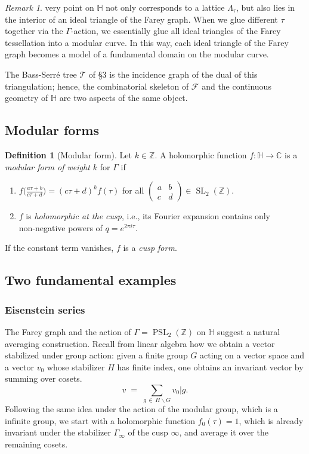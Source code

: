 \documentclass[10pt, a4paper]{article}
\newcommand{\C}{\mathbb{C}}
\newcommand{\Z}{\mathbb{Z}}
\newcommand{\HH}{\mathbb{H}} %
\newcommand{\SL}{\operatorname{SL}_2(\Z)}
\newcommand{\PSL}{\operatorname{PSL}_2(\Z)}
\theoremstyle{definition}
\newtheorem{definition}[theorem]{Definition}
\theoremstyle{remark}
\newtheorem{remark}[theorem]{Remark}
\begin{document}
\begin{remark}
very point on $\HH$ not only corresponds to a lattice $\Lambda_\tau$, but also lies in the interior of an ideal triangle of the Farey graph.
When we glue different $\tau$ together via the $\Gamma$-action, we essentially glue all ideal triangles of the Farey tessellation into a modular curve.
In this way, each ideal triangle of the Farey graph becomes a model of a fundamental domain on the modular curve.
\end{remark}

The Bass-Serré tree $\mathcal{T}$ of \S3 is the incidence graph of the dual of this triangulation; hence, the combinatorial skeleton of $\mathcal{F}$ and the continuous geometry of $\HH$ are two aspects of the same object.

\subsection{Modular forms}



\begin{definition}[Modular form]\cite{Serre1973}
Let $k\in\Z$. A holomorphic function $f:\HH\to\C$ is a \emph{modular form of weight $k$} for $\Gamma$ if
\begin{enumerate}
    \item $f\!\big(\frac{a\tau+b}{c\tau+d}\big) = (c\tau+d)^k f(\tau)$ for all $\begin{pmatrix}a&b\\c&d\end{pmatrix}\in\SL$.
    \item $f$ is \emph{holomorphic at the cusp}, i.e., its Fourier expansion contains only non‑negative powers of $q = e^{2\pi i\tau}$.
\end{enumerate}
If the constant term vanishes, $f$ is a \emph{cusp form}.
\end{definition}



\subsection{Two fundamental examples}

\subsubsection{Eisenstein series}
\label{subsec:Eisenstein_series}

The Farey graph and the action of $\Gamma=\PSL$ on $\HH$ suggest a natural averaging construction.
Recall from linear algebra how we obtain a vector stabilized under group action: given a finite group $G$ acting on a vector space and a vector $v_0$ whose stabilizer $H$ has finite index, one obtains an invariant vector by summing over cosets.\cite{Zagier2008}
\[
v \;=\; \sum_{g\,\in\,H\backslash G} v_0|g .
\]
Following the same idea under the action of the modular group, which is a infinite group, we start with a holomorphic function $f_0(\tau)=1$, which is already invariant under the stabilizer $\Gamma_\infty$ of the cusp $\infty$, and average it over the remaining cosets.
\end{document}
